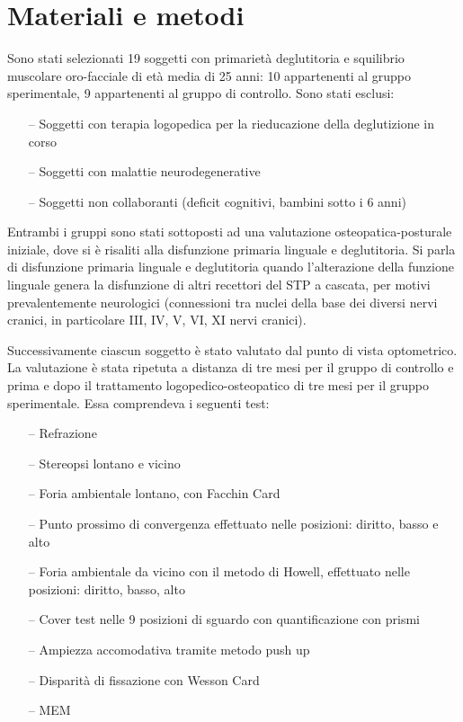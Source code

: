 \section{Materiali e metodi}

Sono stati selezionati 19 soggetti con primarietà deglutitoria e squilibrio muscolare oro-facciale di età media di 25 anni:
10 appartenenti al gruppo sperimentale, 9 appartenenti al gruppo di controllo. Sono stati esclusi:
\begin{itemize}
 \itemsep-0.5em
 \item[--]Soggetti con terapia logopedica per la rieducazione della deglutizione in corso
 \item[--]Soggetti con malattie neurodegenerative
 \item[--]Soggetti non collaboranti (deficit cognitivi, bambini sotto i 6 anni)
\end{itemize}
Entrambi i gruppi sono stati sottoposti ad una valutazione osteopatica-posturale iniziale, dove si è risaliti alla
disfunzione primaria linguale e deglutitoria. Si parla di disfunzione primaria linguale e deglutitoria quando l’alterazione
della funzione linguale genera la disfunzione di altri recettori del STP a cascata, per motivi prevalentemente neurologici
(connessioni tra nuclei della base dei diversi nervi cranici, in particolare III, IV, V, VI, XI nervi cranici).

Successivamente ciascun soggetto è stato valutato dal punto di vista optometrico. La valutazione è stata ripetuta a
distanza di tre mesi per il gruppo di controllo e prima e dopo il trattamento logopedico-osteopatico di tre mesi per il
gruppo sperimentale. Essa comprendeva i seguenti test:

\begin{itemize}
 \itemsep-0.5em
 \item[--]Refrazione
 \item[--]Stereopsi lontano e vicino
 \item[--]Foria ambientale lontano, con Facchin Card
 \item[--]Punto prossimo di convergenza effettuato nelle posizioni: diritto, basso e alto
 \item[--]Foria ambientale da vicino con il metodo di Howell, effettuato nelle posizioni: diritto, basso, alto
 \item[--]Cover test nelle 9 posizioni di sguardo con quantificazione con prismi
 \item[--]Ampiezza accomodativa tramite metodo push up
 \item[--]Disparità di fissazione con Wesson Card
 \item[--]MEM
 \end{itemize}
 

